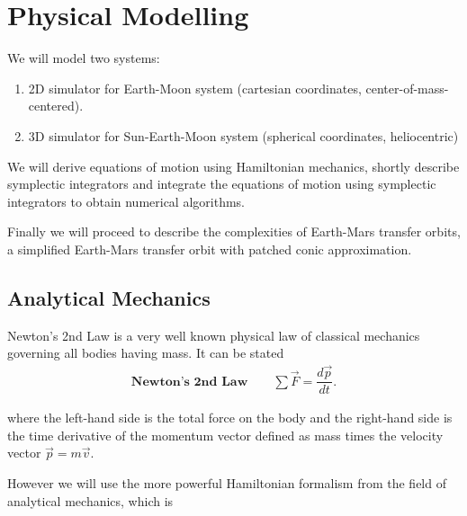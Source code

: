 
\chapter{Physical Modelling}
We will model two systems:
\begin{enumerate}
	\item 2D simulator for Earth-Moon system (cartesian coordinates, center-of-mass-centered).
	\item 3D simulator for Sun-Earth-Moon system (spherical coordinates, heliocentric)
\end{enumerate}

We will derive equations of motion using Hamiltonian mechanics, shortly describe symplectic integrators and integrate the equations of motion using symplectic integrators to obtain numerical algorithms.

Finally we will proceed to describe the complexities of Earth-Mars transfer orbits, a simplified Earth-Mars transfer orbit with patched conic approximation.

\section{Analytical Mechanics}
Newton's 2nd Law is a very well known physical law of classical mechanics governing all bodies having mass. It can be stated \cite{Knudsen2002}
\begin{align}
    \label{eq:newton2}
    \textbf{Newton's 2nd Law} \qquad \sum{\vec{F}} = \dfrac{d \vec{p}}{dt}.
\end{align}

where the left-hand side is the total force on the body and the right-hand side is the time derivative of the momentum vector defined as mass times the velocity vector \(\vec{p} = m \vec{v}\).

However we will use the more powerful Hamiltonian formalism from the field of analytical mechanics, which is \cite{Knudsen2002}

